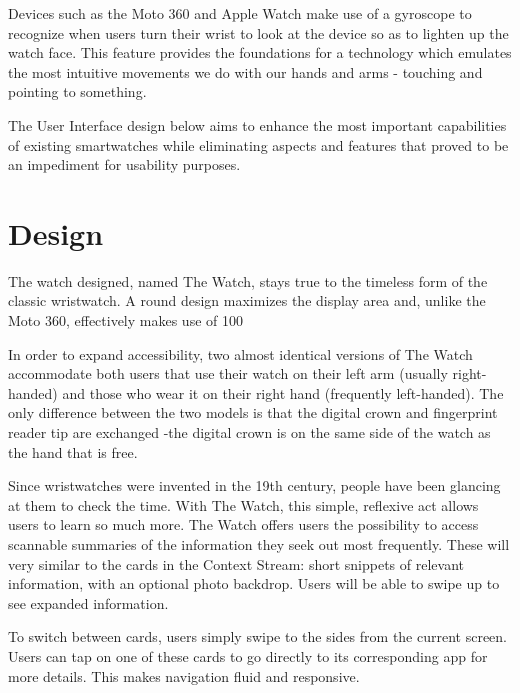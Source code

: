 \documentclass{article}
\begin{document}
Devices such as the Moto 360 and Apple Watch make use of a gyroscope to recognize when users turn their wrist to look at the device so as to lighten up the watch face. This feature provides the foundations for a technology which emulates the most intuitive movements we do with our hands and arms - touching and pointing to something. 

The User Interface design below aims to enhance the most important capabilities of existing smartwatches while eliminating aspects and features that proved to be an impediment for usability purposes.

\section{Design}
The watch designed, named The Watch, stays true to the timeless form of the classic wristwatch. A round design maximizes the display area and, unlike the Moto 360, effectively makes use of 100%

In order to expand accessibility, two almost identical versions of The Watch accommodate both users that use their watch on their left arm (usually right-handed) and those who wear it on their right hand (frequently left-handed). The only difference between the two models is that the digital crown and fingerprint reader tip are exchanged -the digital crown is on the same side of the watch as the hand that is free.

Since wristwatches were invented in the 19th century, people have been glancing at them to check the time. With The Watch, this simple, reflexive act allows users to learn so much more. The Watch offers users the possibility to access scannable summaries of the information they seek out most frequently. These will very similar to the cards in the Context Stream: short snippets of relevant information, with an optional photo backdrop. Users will be able to swipe up to see expanded information. 

 To switch between cards, users simply swipe to the sides from the current screen. Users can tap on one of these cards to go directly to its corresponding app for more details. This makes navigation fluid and responsive.
\end{document}
